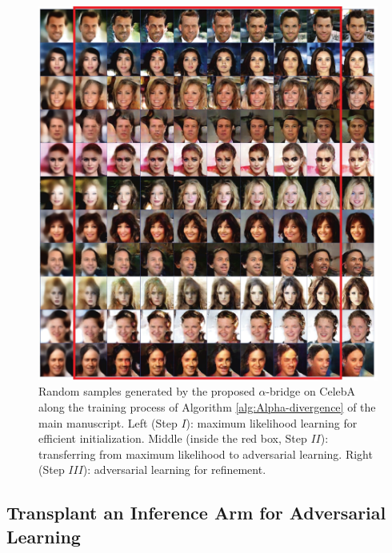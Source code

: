 \documentclass[letterpaper]{article} %
\begin{document}
\begin{figure}[H]
	\begin{center}
		\includegraphics[width=0.95\columnwidth]{Figures/sample_celeb_big.pdf}
		\caption{\small Random samples generated by the proposed $\alpha$-bridge on CelebA along the training process of Algorithm \ref{alg:Alpha-divergence} of the main manuscript. Left (Step $I$): maximum likelihood learning for efficient initialization. 
			Middle (inside the red box, Step $I\!I$): transferring from maximum likelihood to adversarial learning. Right (Step $I\!I\!I$): adversarial learning for refinement. 
		}
		\label{fig:app_sample_celeb_big}
	\end{center}
\end{figure}





\subsection{Transplant an Inference Arm for Adversarial Learning}
\label{sec:app_TransInferArm}
\end{document}
